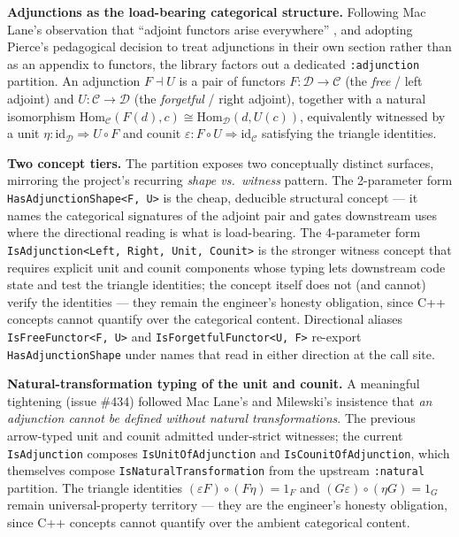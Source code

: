 \documentclass[11pt, a4paper]{report}
\begin{document}
\textbf{Adjunctions as the load-bearing categorical structure.} Following Mac Lane's observation that ``adjoint functors arise everywhere'' \cite{maclane1971categories}, and adopting Pierce's \cite{pierce1991basic} pedagogical decision to treat adjunctions in their own section rather than as an appendix to functors, the library factors out a dedicated \texttt{:adjunction} partition. An adjunction $F \dashv U$ is a pair of functors $F: \mathcal{D} \to \mathcal{C}$ (the \emph{free} / left adjoint) and $U: \mathcal{C} \to \mathcal{D}$ (the \emph{forgetful} / right adjoint), together with a natural isomorphism $\mathrm{Hom}_\mathcal{C}(F(d), c) \cong \mathrm{Hom}_\mathcal{D}(d, U(c))$, equivalently witnessed by a unit $\eta: \mathrm{id}_\mathcal{D} \Rightarrow U \circ F$ and counit $\varepsilon: F \circ U \Rightarrow \mathrm{id}_\mathcal{C}$ satisfying the triangle identities.

\textbf{Two concept tiers.} The partition exposes two conceptually distinct surfaces, mirroring the project's recurring \emph{shape vs.\ witness} pattern. The 2-parameter form \texttt{HasAdjunctionShape<F, U>} is the cheap, deducible structural concept --- it names the categorical signatures of the adjoint pair and gates downstream uses where the directional reading is what is load-bearing. The 4-parameter form \texttt{IsAdjunction<Left, Right, Unit, Counit>} is the stronger witness concept that requires explicit unit and counit components whose typing lets downstream code state and test the triangle identities; the concept itself does not (and cannot) verify the identities --- they remain the engineer's honesty obligation, since C++ concepts cannot quantify over the categorical content. Directional aliases \texttt{IsFreeFunctor<F, U>} and \texttt{IsForgetfulFunctor<U, F>} re-export \texttt{HasAdjunctionShape} under names that read in either direction at the call site.

\textbf{Natural-transformation typing of the unit and counit.} A meaningful tightening (issue \#434) followed Mac Lane's and Milewski's \cite{milewski2018category} insistence that \emph{an adjunction cannot be defined without natural transformations}. The previous arrow-typed unit and counit admitted under-strict witnesses; the current \texttt{IsAdjunction} composes \texttt{IsUnitOfAdjunction} and \texttt{IsCounitOfAdjunction}, which themselves compose \texttt{IsNaturalTransformation} from the upstream \texttt{:natural} partition. The triangle identities $(\varepsilon F) \circ (F \eta) = 1_F$ and $(G \varepsilon) \circ (\eta G) = 1_G$ remain universal-property territory --- they are the engineer's honesty obligation, since C++ concepts cannot quantify over the ambient categorical content.
\end{document}
